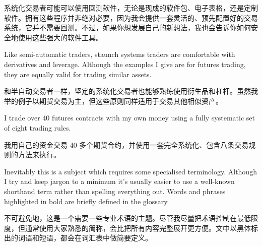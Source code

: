 \begin{chineseblock}系统化交易者可能可以使用回测软件，无论是现成的软件包、电子表格，还是定制软件。拥有这些程序并非绝对必要，因为我会提供一套灵活的、预先配置好的交易系统，它并不需要回测。不过，如果你想发展自己的新想法，我也会告诉你如何安全地使用这些强大的软件工具。\end{chineseblock}

\bipairgap

\begin{englishblock} Like semi-automatic traders, staunch systems traders are comfortable with derivatives and leverage. Although the examples I give are for futures trading, they are equally valid for trading similar assets. \end{englishblock}

\begin{chineseblock}和半自动交易者一样，坚定的系统化交易者也能够熟练使用衍生品和杠杆。虽然我举的例子以期货交易为主，但这些原则同样适用于交易其他相似资产。\end{chineseblock}

\bipairgap

\begin{englishblock} I trade over 40 futures contracts with my own money using a fully systematic set of eight trading rules. \end{englishblock}

\begin{chineseblock}我用自己的资金交易 40 多个期货合约，并使用一套完全系统化、包含八条交易规则的方法来执行。\end{chineseblock}


\begin{englishblock} Inevitably this is a subject which requires some specialised terminology. Although I try and keep jargon to a minimum it's usually easier to use a well-known shorthand term rather than spelling everything out. Words and phrases highlighted in bold are briefly defined in the glossary. \end{englishblock}

\begin{chineseblock}不可避免地，这是一个需要一些专业术语的主题。尽管我尽量把术语控制在最低限度，但通常使用大家熟悉的简称，会比把所有内容完整展开更方便。文中以黑体标出的词语和短语，都会在词汇表中做简要定义。\end{chineseblock}

\bipairgap

